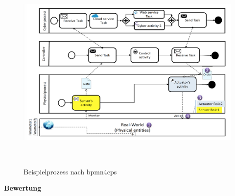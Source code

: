 \documentclass[a4paper, 12pt, twoside, headsepline=true]{scrartcl} %
\begin{document}
\begin{figure}[H]
	\includegraphics[height=10cm,keepaspectratio,center]{figures/bpmn4cpsProcess}
	\caption{Beispielprozess nach \ac{bpmn4cps} \cite{BMPN4CPS}}
	\label{fig:bpmn4cpsProcess}
\end{figure} 

\textbf{Bewertung}
\end{document}
